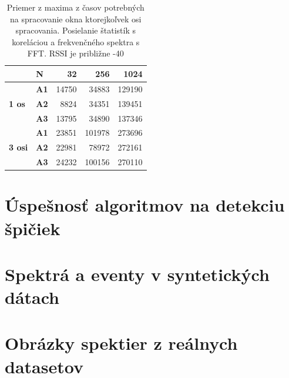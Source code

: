 \begin{table}[h]
\def\arraystretch{1.25}
\begin{tabular}{|l|l|r|r|r|}
\hline
\textbf{}                       & \textbf{N}  & \textbf{32} & \textbf{256} & \textbf{1024} \\ \hline
\multirow{3}{*}{\textbf{1 os}}  & \textbf{A1} & 14750       & 34883        & 129190        \\ \cline{2-5} 
                                & \textbf{A2} & 8824        & 34351        & 139451        \\ \cline{2-5} 
                                & \textbf{A3} & 13795       & 34890        & 137346        \\ \hline
\multirow{3}{*}{\textbf{3 osi}} & \textbf{A1} & 23851       & 101978       & 273696        \\ \cline{2-5} 
                                & \textbf{A2} & 22981       & 78972        & 272161        \\ \cline{2-5} 
                                & \textbf{A3} & 24232       & 100156       & 270110        \\ \hline
\end{tabular}
\caption{Priemer z maxima z časov potrebných na spracovanie okna ktorejkoľvek osi spracovania. Posielanie štatistík s koreláciou a
frekvenčného spektra s FFT. RSSI je približne -40}
\end{table}


\section{Úspešnosť algoritmov na detekciu špičiek}




\section{Spektrá a eventy v syntetických dátach}


\section{Obrázky spektier z reálnych datasetov}

\emptypage
